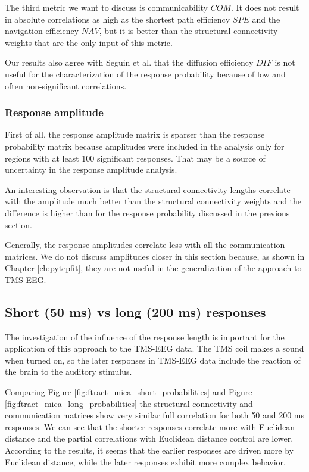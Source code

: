 The third metric we want to discuss is communicability $COM$. It does not result in absolute correlations as high as the shortest path efficiency $SPE$ and the navigation efficiency $NAV$, but it is better than the structural connectivity weights that are the only input of this metric. 

Our results also agree with Seguin et al. that the diffusion efficiency $DIF$ is not useful for the characterization of the response probability because of low and often non-significant correlations. 

\subsubsection{Response amplitude}

First of all, the response amplitude matrix is sparser than the response probability matrix because amplitudes were included in the analysis only for regions with at least 100 significant responses. That may be a source of uncertainty in the response amplitude analysis. 

An interesting observation is that the structural connectivity lengths correlate with the amplitude much better than the structural connectivity weights and the difference is higher than for the response probability discussed in the previous section.

Generally, the response amplitudes correlate less with all the communication matrices. We do not discuss amplitudes closer in this section because, as shown in Chapter \ref{ch:pytepfit}, they are not useful in the generalization of the approach to TMS-EEG.

\subsection{Short (50 ms) vs long (200 ms) responses}\label{sec:response-length_F-Tract}

The investigation of the influence of the response length is important for the application of this approach to the TMS-EEG data. The TMS coil makes a sound when turned on, so the later responses in TMS-EEG data include the reaction of the brain to the auditory stimulus. 

Comparing Figure \ref{fig:ftract_mica_short_probabilities} and Figure \ref{fig:ftract_mica_long_probabilities} the structural connectivity and communication matrices show very similar full correlation for both 50 and 200 ms responses. We can see that the shorter responses correlate more with Euclidean distance and the partial correlations with Euclidean distance control are lower. According to the results, it seems that the earlier responses are driven more by Euclidean distance, while the later responses exhibit more complex behavior. 

